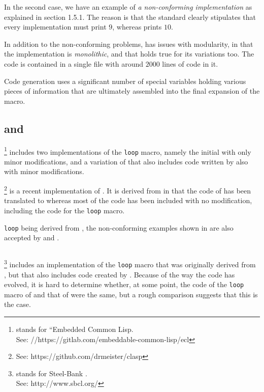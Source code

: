 In the second case, we have an example of \emph{a non-conforming
  implementation} as explained in section 1.5.1.  The reason is that
the standard clearly stipulates that every implementation must print
$9$, whereas \mitloop{} prints $10$.

In addition to the non-conforming problems, \mitloop{} has issues with
modularity, in that the implementation is \emph{monolithic}, and that
holds true for its variations too.  The code is contained in a single
file with around $2000$ lines of code in it.

Code generation uses a significant number of special variables holding
various pieces of information that are ultimately assembled into the
final expansion of the macro.

\subsection{\ecl{} and \clasp{}}

\ecl{}%
\footnote{\ecl{} stands for ``Embedded Common Lisp.\\
See: //https://gitlab.com/embeddable-common-lisp/ecl}
includes two implementations of the \texttt{loop} macro, namely
the initial \mitloop{} with only minor modifications, and a variation
of \mitloop{} that also includes code written
by \symbolics{} also with minor modifications.

\clasp{}%
\footnote{See: https://github.com/drmeister/clasp} is a recent
implementation of \commonlisp{}.  It is derived from \ecl{} in that
the \clanguage{} \cite{iso:c} code of \ecl{} has been translated to
\cplusplus{} \cite{iso:cplusplus} whereas most of the \commonlisp{}
code has been included with no modification, including the code for
the \texttt{loop} macro.

\ecl{} \texttt{loop} being derived from \mitloop{}, the non-conforming
examples shown in  are also accepted by \ecl{} and
\clasp{}.

\subsection{\sbcl{}}

\sbcl{}%
\footnote{\sbcl{} stands for Steel-Bank \commonlisp{}.\\ See:
  http://www.sbcl.org/} includes an implementation of the
\texttt{loop} macro that was originally derived from \mitloop{}, but
that also includes code created by \symbolics{}.  Because of the way
the code has evolved, it is hard to determine whether, at some point,
the code of the \texttt{loop} macro of \sbcl{} and that of \ecl{} were
the same, but a rough comparison suggests that this is the case.

